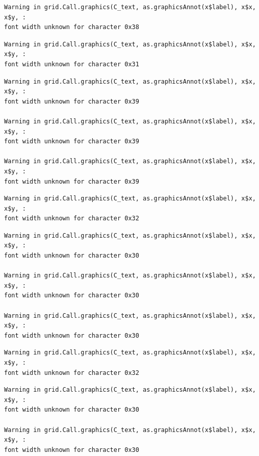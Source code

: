 \documentclass[
  letterpaper,
  DIV=11,
  numbers=noendperiod]{scrreprt}
\begin{document}
\begin{verbatim}
Warning in grid.Call.graphics(C_text, as.graphicsAnnot(x$label), x$x, x$y, :
font width unknown for character 0x38
\end{verbatim}

\begin{verbatim}
Warning in grid.Call.graphics(C_text, as.graphicsAnnot(x$label), x$x, x$y, :
font width unknown for character 0x31
\end{verbatim}

\begin{verbatim}
Warning in grid.Call.graphics(C_text, as.graphicsAnnot(x$label), x$x, x$y, :
font width unknown for character 0x39

Warning in grid.Call.graphics(C_text, as.graphicsAnnot(x$label), x$x, x$y, :
font width unknown for character 0x39

Warning in grid.Call.graphics(C_text, as.graphicsAnnot(x$label), x$x, x$y, :
font width unknown for character 0x39
\end{verbatim}

\begin{verbatim}
Warning in grid.Call.graphics(C_text, as.graphicsAnnot(x$label), x$x, x$y, :
font width unknown for character 0x32
\end{verbatim}

\begin{verbatim}
Warning in grid.Call.graphics(C_text, as.graphicsAnnot(x$label), x$x, x$y, :
font width unknown for character 0x30

Warning in grid.Call.graphics(C_text, as.graphicsAnnot(x$label), x$x, x$y, :
font width unknown for character 0x30

Warning in grid.Call.graphics(C_text, as.graphicsAnnot(x$label), x$x, x$y, :
font width unknown for character 0x30
\end{verbatim}

\begin{verbatim}
Warning in grid.Call.graphics(C_text, as.graphicsAnnot(x$label), x$x, x$y, :
font width unknown for character 0x32
\end{verbatim}

\begin{verbatim}
Warning in grid.Call.graphics(C_text, as.graphicsAnnot(x$label), x$x, x$y, :
font width unknown for character 0x30

Warning in grid.Call.graphics(C_text, as.graphicsAnnot(x$label), x$x, x$y, :
font width unknown for character 0x30
\end{verbatim}
\end{document}
